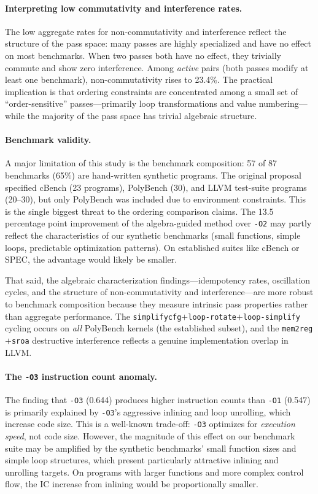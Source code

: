 \documentclass[11pt]{article}
\begin{document}
\paragraph{Interpreting low commutativity and interference rates.}
The low aggregate rates for non-commutativity and interference reflect the structure of the pass space: many passes are highly specialized and have no effect on most benchmarks. When two passes both have no effect, they trivially commute and show zero interference. Among \emph{active} pairs (both passes modify at least one benchmark), non-commutativity rises to 23.4\%. The practical implication is that ordering constraints are concentrated among a small set of ``order-sensitive'' passes---primarily loop transformations and value numbering---while the majority of the pass space has trivial algebraic structure.

\paragraph{Benchmark validity.}
A major limitation of this study is the benchmark composition: 57 of 87 benchmarks (65\%) are hand-written synthetic programs. The original proposal specified cBench (23 programs), PolyBench (30), and LLVM test-suite programs (20--30), but only PolyBench was included due to environment constraints. This is the single biggest threat to the ordering comparison claims. The 13.5 percentage point improvement of the algebra-guided method over \texttt{-O2} may partly reflect the characteristics of our synthetic benchmarks (small functions, simple loops, predictable optimization patterns). On established suites like cBench or SPEC, the advantage would likely be smaller.

That said, the algebraic characterization findings---idempotency rates, oscillation cycles, and the structure of non-commutativity and interference---are more robust to benchmark composition because they measure intrinsic pass properties rather than aggregate performance. The \texttt{simplifycfg}$+$\texttt{loop-rotate}$+$\texttt{loop-simplify} cycling occurs on \emph{all} PolyBench kernels (the established subset), and the \texttt{mem2reg}$+$\texttt{sroa} destructive interference reflects a genuine implementation overlap in LLVM.

\paragraph{The \texttt{-O3} instruction count anomaly.}
The finding that \texttt{-O3} (0.644) produces higher instruction counts than \texttt{-O1} (0.547) is primarily explained by \texttt{-O3}'s aggressive inlining and loop unrolling, which increase code size. This is a well-known trade-off: \texttt{-O3} optimizes for \emph{execution speed}, not code size. However, the magnitude of this effect on our benchmark suite may be amplified by the synthetic benchmarks' small function sizes and simple loop structures, which present particularly attractive inlining and unrolling targets. On programs with larger functions and more complex control flow, the IC increase from inlining would be proportionally smaller.
\end{document}
